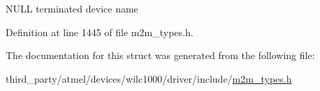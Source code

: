 N\+U\+LL terminated device name 

Definition at line 1445 of file m2m\+\_\+types.\+h.



The documentation for this struct was generated from the following file\+:\begin{DoxyCompactItemize}
\item 
third\+\_\+party/atmel/devices/wilc1000/driver/include/\hyperlink{m2m__types_8h}{m2m\+\_\+types.\+h}\end{DoxyCompactItemize}
